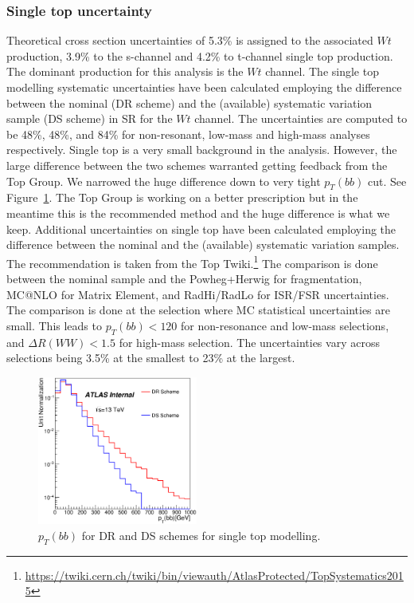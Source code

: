 \subsubsection{Single top uncertainty}
Theoretical cross section uncertainties of 5.3\% is assigned to the associated $Wt$ production,  3.9\% to the s-channel and 4.2\% to t-channel single top production.  The dominant production for this analysis is the $Wt$ channel.  The single top modelling systematic uncertainties have been calculated employing the difference between the nominal (DR scheme) and the (available) systematic variation sample (DS scheme) in SR for the $Wt$ channel. The uncertainties are computed to be 48\%, 48\%, and 84\% for non-resonant, low-mass and high-mass analyses respectively.  Single top is a very small background in the analysis. However, the large difference between the two schemes warranted getting feedback from the Top Group. We narrowed the huge difference down to very tight $p_{T} (bb)$ cut. See Figure~\ref{fig:stop_bbpt}. The Top Group is working on a better prescription but in the meantime this is the recommended method and the huge difference is what we keep. 
Additional uncertainties on single top have been calculated employing the difference between the nominal and the (available) systematic variation samples. The recommendation is taken from the Top Twiki.{\footnote {\url{https://twiki.cern.ch/twiki/bin/viewauth/AtlasProtected/TopSystematics2015}}} 
The comparison is done between the nominal sample and the Powheg+Herwig for fragmentation, MC@NLO for Matrix Element, and RadHi/RadLo for ISR/FSR uncertainties. The comparison is done at the selection where MC statistical uncertainties are small. This leads to $p_{T}(bb) < 120$ for non-resonance and low-mass selections, and $\Delta R(WW) < 1.5$ for high-mass selection. 
The uncertainties vary across selections being 3.5\% at the smallest to 23\% at the largest.%

\begin{figure}[!h]
\begin{center}
\includegraphics*[width=0.47\textwidth] {figures/DR_DS_bbpt.eps}
\caption[$p_{T}(bb)$  for DR and DS schemes for single top modelling.]{$p_{T}(bb)$  for DR and DS schemes for single top modelling.}
\label{fig:stop_bbpt}
\end{center}
\end{figure}

